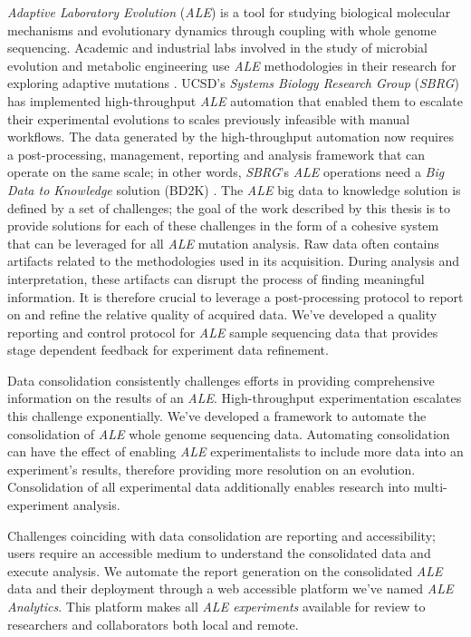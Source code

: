 \documentclass[12pt,final,masters,chapterheads]{ucsd}  %
\begin{document}
\textit{Adaptive Laboratory Evolution} (\textit{ALE}) is a tool for studying biological molecular mechanisms and evolutionary dynamics through coupling with whole genome sequencing. Academic and industrial labs involved in the study of microbial evolution and metabolic engineering use \textit{ALE} methodologies in their research for exploring adaptive mutations \cite{ASM:/content/journal/microbe/10.1128/microbe.6.69.1}. UCSD's \textit{Systems Biology Research Group} (\textit{SBRG}) has implemented high-throughput \textit{ALE} automation that enabled them to escalate their experimental evolutions to scales previously infeasible with manual workflows. The data generated by the high-throughput automation now requires a post-processing, management, reporting and analysis framework that can operate on the same scale; in other words, \textit{SBRG}'s \textit{ALE} operations need a \textit{Big Data to Knowledge} solution (BD2K) \cite{Margolis957}. The \textit{ALE} big data to knowledge solution is defined by a set of challenges; the goal of the work described by this thesis is to provide solutions for each of these challenges in the form of a cohesive system that can be leveraged for all \textit{ALE} mutation analysis.
%
%
Raw data often contains artifacts related to the methodologies used in its acquisition. During analysis and interpretation, these artifacts can disrupt the process of finding meaningful information. It is therefore crucial to leverage a post-processing protocol to report on and refine the relative quality of acquired data. We've developed a quality reporting and control protocol for \textit{ALE} sample sequencing data that provides stage dependent feedback for experiment data refinement.

Data consolidation consistently challenges efforts in providing comprehensive information on the results of an \textit{ALE}. High-throughput experimentation escalates this challenge exponentially. We've developed a framework to automate the consolidation of \textit{ALE} whole genome sequencing data. Automating consolidation can have the effect of enabling \textit{ALE} experimentalists to include more data into an experiment's results, therefore providing more resolution on an evolution. Consolidation of all experimental data additionally enables research into multi-experiment analysis.

Challenges coinciding with data consolidation are reporting and accessibility; users require an accessible medium to understand the consolidated data and execute analysis. We automate the report generation on the consolidated \textit{ALE} data and their deployment through a web accessible platform we've named \textit{ALE Analytics}. This platform makes all \textit{ALE experiments} available for review to researchers and collaborators both local and remote.
\end{document}
